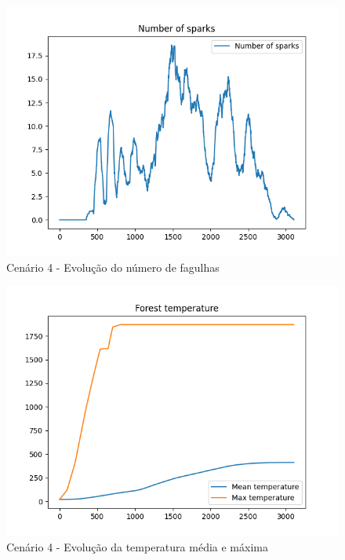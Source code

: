 \begin{figure}[H]
    \centering
    \includegraphics[width=\textwidth]{../src/runs/scenario4/sparks}
    \caption{Cenário 4 - Evolução do número de fagulhas}
    \label{fig:S4Sparks}
\end{figure}

\begin{figure}[H]
    \centering
    \includegraphics[width=\textwidth]{../src/runs/scenario4/temperature}
    \caption{Cenário 4 - Evolução da temperatura média e máxima}
    \label{fig:S4Temp}
\end{figure}